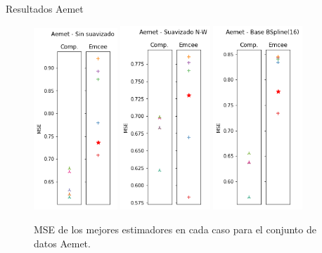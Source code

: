 \documentclass[10pt, professionalfonts]{beamer}
\begin{document}
\begin{frame}{Resultados Aemet}
  \begin{figure}
    \includegraphics[width=0.28\textwidth]{img/results-new/reg_aemet_none}\hfill
    \includegraphics[width=0.3\textwidth]{img/results-new/reg_aemet_nw}\hfill
    \includegraphics[width=0.3\textwidth]{img/results-new/reg_aemet_basis}
    \caption{MSE de los mejores estimadores en cada caso para el conjunto de datos Aemet.}
  \end{figure}
\end{frame}
\end{document}
